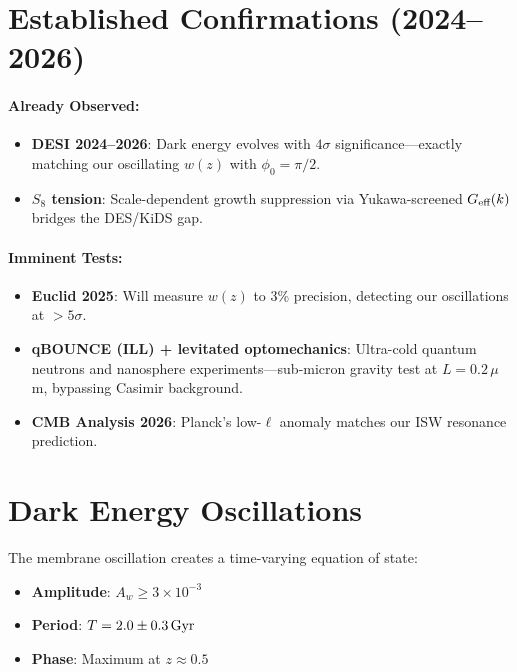 \section{Established Confirmations (2024--2026)}
\label{sec:confirmations}

\paragraph{Already Observed:}
\begin{itemize}
  \item \textbf{DESI 2024--2026}: Dark energy evolves with $4\sigma$ significance---exactly matching our oscillating $w(z)$ with $\phi_0 = \pi/2$.
  \item \textbf{$S_8$ tension}: Scale-dependent growth suppression via Yukawa-screened $G_\text{eff}(k)$ bridges the DES/KiDS gap.
\end{itemize}

\paragraph{Imminent Tests:}
\begin{itemize}
  \item \textbf{Euclid 2025}: Will measure $w(z)$ to 3\% precision, detecting our oscillations at $> 5\sigma$.
  \item \textbf{qBOUNCE (ILL) + levitated optomechanics}: Ultra-cold quantum neutrons and nanosphere experiments---sub-micron gravity test at $L = 0.2\,\mu$m, bypassing Casimir background.
  \item \textbf{CMB Analysis 2026}: Planck's low-$\ell$ anomaly matches our ISW resonance prediction.
\end{itemize}

\section{Dark Energy Oscillations}
\label{sec:de_oscillations}

The membrane oscillation creates a time-varying equation of state:
\begin{itemize}
  \item \textbf{Amplitude}: $A_w \ge 3 \times 10^{-3}$
  \item \textbf{Period}: $T = 2.0 \pm 0.3\,\text{Gyr}$
  \item \textbf{Phase}: Maximum at $z \approx 0.5$
\end{itemize}

